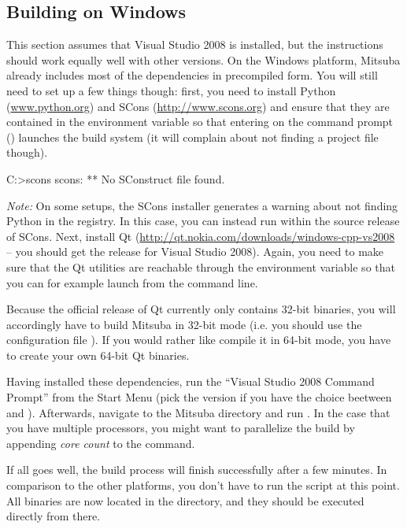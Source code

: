 \subsection{Building on Windows}
This section assumes that Visual Studio 2008 is installed, but the instructions should work equally well with other versions.
On the Windows platform, Mitsuba already includes most of the dependencies in precompiled form.
You will still need to set up a few things though: first, you need to install Python 
(\url{www.python.org}) and SCons (\url{http://www.scons.org}) and ensure that they are contained
in the  environment variable so that entering  on the command prompt
() launches the build system (it will complain about not finding a project file though).
\begin{shell}
C:\Users\Wenzel>scons
scons: ** No SConstruct file found.
\end{shell}
\emph{Note: }On some setups, the SCons installer generates a warning about not finding Python in the registry. In this case, you can instead run  within the source release of SCons.
Next, install Qt (\url{http://qt.nokia.com/downloads/windows-cpp-vs2008} -- you should get the release for Visual Studio 2008). Again, you need to make sure that the 
Qt utilities are reachable through the  environment variable so that you can for example launch  from the command line.

Because the official release of Qt currently only contains 32-bit binaries, you will accordingly have to 
build Mitsuba in 32-bit mode (i.e. you should use the configuration file ). If you would rather like compile it in 64-bit mode, you have to create
your own 64-bit Qt binaries.

Having installed these dependencies, run the ``Visual Studio 2008 Command 
Prompt'' from the Start Menu (pick the  version if you have the choice beetween  and ). Afterwards,
navigate to the Mitsuba directory and run . 
In the case that you have multiple processors, you might want to parallelize the build by appending \emph{core count} to the  command.

If all goes well, the build process will finish successfully after a few
minutes. In comparison to the other platforms, you don't have to run the  script at this point. 
All binaries are now located in the  directory, and they should be executed directly from there.

